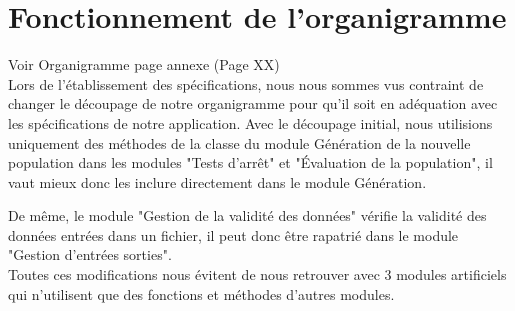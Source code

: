 \documentclass[a4paper,11pt]{article}
\begin{document}
	\section{Fonctionnement de l'organigramme}
		Voir Organigramme page annexe (Page XX)\\

		Lors de l'établissement des spécifications, nous nous sommes vus contraint de changer le découpage de notre organigramme pour qu’il soit en adéquation avec les spécifications de notre application. 
		Avec le découpage initial, nous utilisions uniquement des méthodes de la classe du module Génération de la nouvelle population dans les modules "Tests d’arrêt" et "Évaluation de la population", il vaut mieux donc les inclure directement dans le module Génération.

		De même, le module "Gestion de la validité des données" vérifie la validité des données entrées dans un fichier, il peut donc être rapatrié dans le module "Gestion d'entrées sorties". \\

		Toutes ces modifications nous évitent de nous retrouver avec 3 modules artificiels qui n'utilisent que des fonctions et méthodes d'autres modules.

		
		
\end{document}
